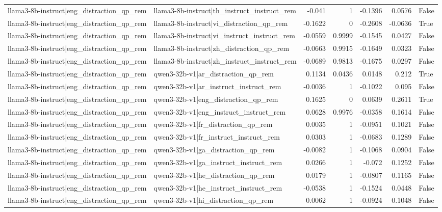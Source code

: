 \begin{table}
\begin{tabular}{l l r r r r l}
llama3-8b-instruct|eng_distraction_qp_rem & llama3-8b-instruct|th_instruct_instruct_rem & -0.041 & 1 & -0.1396 & 0.0576 & False \\
llama3-8b-instruct|eng_distraction_qp_rem & llama3-8b-instruct|vi_distraction_qp_rem & -0.1622 & 0 & -0.2608 & -0.0636 & True \\
llama3-8b-instruct|eng_distraction_qp_rem & llama3-8b-instruct|vi_instruct_instruct_rem & -0.0559 & 0.9999 & -0.1545 & 0.0427 & False \\
llama3-8b-instruct|eng_distraction_qp_rem & llama3-8b-instruct|zh_distraction_qp_rem & -0.0663 & 0.9915 & -0.1649 & 0.0323 & False \\
llama3-8b-instruct|eng_distraction_qp_rem & llama3-8b-instruct|zh_instruct_instruct_rem & -0.0689 & 0.9813 & -0.1675 & 0.0297 & False \\
llama3-8b-instruct|eng_distraction_qp_rem & qwen3-32b-v1|ar_distraction_qp_rem & 0.1134 & 0.0436 & 0.0148 & 0.212 & True \\
llama3-8b-instruct|eng_distraction_qp_rem & qwen3-32b-v1|ar_instruct_instruct_rem & -0.0036 & 1 & -0.1022 & 0.095 & False \\
llama3-8b-instruct|eng_distraction_qp_rem & qwen3-32b-v1|eng_distraction_qp_rem & 0.1625 & 0 & 0.0639 & 0.2611 & True \\
llama3-8b-instruct|eng_distraction_qp_rem & qwen3-32b-v1|eng_instruct_instruct_rem & 0.0628 & 0.9976 & -0.0358 & 0.1614 & False \\
llama3-8b-instruct|eng_distraction_qp_rem & qwen3-32b-v1|fr_distraction_qp_rem & 0.0035 & 1 & -0.0951 & 0.1021 & False \\
llama3-8b-instruct|eng_distraction_qp_rem & qwen3-32b-v1|fr_instruct_instruct_rem & 0.0303 & 1 & -0.0683 & 0.1289 & False \\
llama3-8b-instruct|eng_distraction_qp_rem & qwen3-32b-v1|ga_distraction_qp_rem & -0.0082 & 1 & -0.1068 & 0.0904 & False \\
llama3-8b-instruct|eng_distraction_qp_rem & qwen3-32b-v1|ga_instruct_instruct_rem & 0.0266 & 1 & -0.072 & 0.1252 & False \\
llama3-8b-instruct|eng_distraction_qp_rem & qwen3-32b-v1|he_distraction_qp_rem & 0.0179 & 1 & -0.0807 & 0.1165 & False \\
llama3-8b-instruct|eng_distraction_qp_rem & qwen3-32b-v1|he_instruct_instruct_rem & -0.0538 & 1 & -0.1524 & 0.0448 & False \\
llama3-8b-instruct|eng_distraction_qp_rem & qwen3-32b-v1|hi_distraction_qp_rem & 0.0062 & 1 & -0.0924 & 0.1048 & False \\

\end{tabular}
\end{table}
